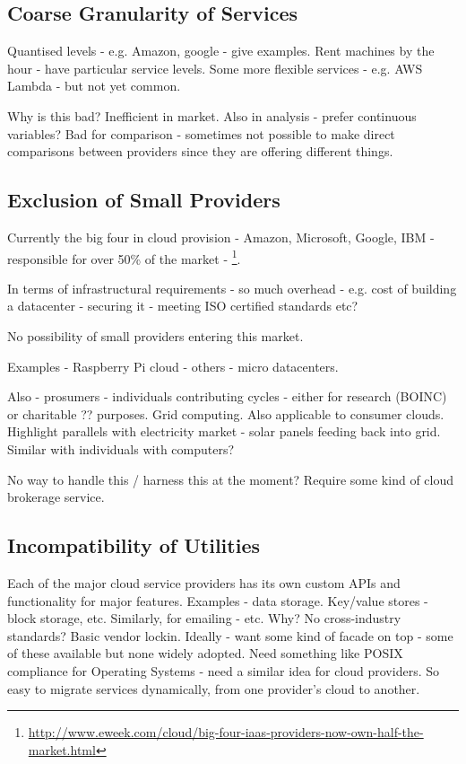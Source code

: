 \documentclass[conference,10pt]{IEEEtran}
\begin{document}

\subsection{Coarse Granularity of Services}

Quantised levels - e.g. Amazon, google - give examples. Rent machines by the hour - have particular service levels. Some more flexible services - e.g. AWS Lambda - but not yet common.

Why is this bad? Inefficient in market. Also in analysis - prefer continuous variables? Bad for comparison - sometimes not possible to make direct comparisons between providers since they are offering different things.


\subsection{Exclusion of Small Providers}

Currently the big four in cloud provision - Amazon, Microsoft, Google, IBM - responsible for over 50\% of the market - \footnote{\url{http://www.eweek.com/cloud/big-four-iaas-providers-now-own-half-the-market.html}}.

In terms of infrastructural requirements - so much overhead - e.g. cost of building a datacenter - securing it - meeting ISO certified standards etc?

No possibility of small providers entering this market. 

Examples - Raspberry Pi cloud - others - micro datacenters.


Also - prosumers - individuals contributing cycles - either for research (BOINC) or charitable ?? purposes. Grid computing. Also applicable to consumer clouds. Highlight parallels with electricity market - solar panels feeding back into grid. Similar with individuals with computers?

No way to handle this / harness this at the moment?
Require some kind of cloud brokerage service.


\subsection{Incompatibility of Utilities}

Each of the major cloud service providers has its own custom APIs and functionality for major features. Examples - data storage. Key/value stores - block storage, etc. Similarly, for emailing - etc. 
Why? No cross-industry standards? 
Basic vendor lockin. Ideally - want some kind of facade on top - some of these available but none widely adopted. Need something like POSIX compliance for Operating Systems - need a similar idea for cloud providers.
So easy to migrate services dynamically, from one provider's cloud to another.
\end{document}
